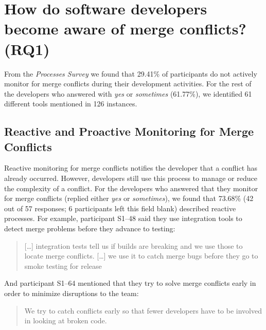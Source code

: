 \section{How do software developers become \textbf{aware} of merge conflicts? (RQ1)}\label{RQ1}

From the \textit{Processes Survey} we found that 29.41\% of participants do not actively monitor for merge conflicts during their development activities.
For the rest of the developers who answered with \emph{yes} or \emph{sometimes} (61.77\%), we identified 61 different tools mentioned in 126 instances.

\subsection{Reactive and Proactive Monitoring for Merge Conflicts}

Reactive monitoring for merge conflicts notifies the developer that a conflict has already occurred.
However, developers still use this process to manage or reduce the complexity of a conflict.
For the developers who answered that they monitor for merge conflicts (replied either \emph{yes} or \emph{sometimes}), we found that 73.68\% (42 out of 57 responses; 6 participants left this field blank) described reactive processes.
For example, participant S1--48 said they use integration tools to detect merge problems before they advance to testing:
\begin{quotation}
	[\ldots] integration tests tell us if builds are breaking and we use those to locate merge conflicts. [\ldots] we use it to catch merge bugs before they go to smoke testing for release
\end{quotation}
And participant S1--64 mentioned that they try to solve merge conflicts early in order to minimize disruptions to the team:
\begin{quotation}
	We try to catch conflicts early so that fewer developers have to be involved in looking at broken code.
\end{quotation}

